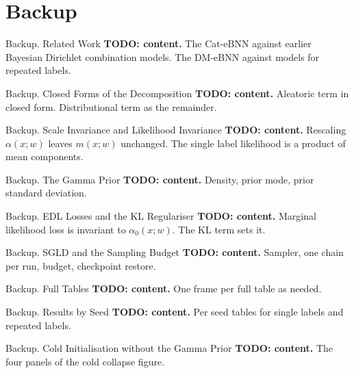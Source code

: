 
\section*{Backup}

\begin{frame}{Backup. Related Work}
	\textbf{TODO: content.} The Cat-eBNN against earlier Bayesian Dirichlet combination models. The DM-eBNN against models for repeated labels.
\end{frame}

\begin{frame}{Backup. Closed Forms of the Decomposition}
	\textbf{TODO: content.} Aleatoric term in closed form. Distributional term as the remainder.
\end{frame}

\begin{frame}{Backup. Scale Invariance and Likelihood Invariance}
	\textbf{TODO: content.} Rescaling $\alpha(x;w)$ leaves $m(x;w)$ unchanged. The single label likelihood is a product of mean components.
\end{frame}

\begin{frame}{Backup. The Gamma Prior}
	\textbf{TODO: content.} Density, prior mode, prior standard deviation.
\end{frame}

\begin{frame}{Backup. EDL Losses and the KL Regulariser}
	\textbf{TODO: content.} Marginal likelihood loss is invariant to $\alpha_0(x;w)$. The KL term sets it.
\end{frame}

\begin{frame}{Backup. SGLD and the Sampling Budget}
	\textbf{TODO: content.} Sampler, one chain per run, budget, checkpoint restore.
\end{frame}

\begin{frame}{Backup. Full Tables}
	\textbf{TODO: content.} One frame per full table as needed.
\end{frame}

\begin{frame}{Backup. Results by Seed}
	\textbf{TODO: content.} Per seed tables for single labels and repeated labels.
\end{frame}

\begin{frame}{Backup. Cold Initialisation without the Gamma Prior}
	\textbf{TODO: content.} The four panels of the cold collapse figure.
\end{frame}
